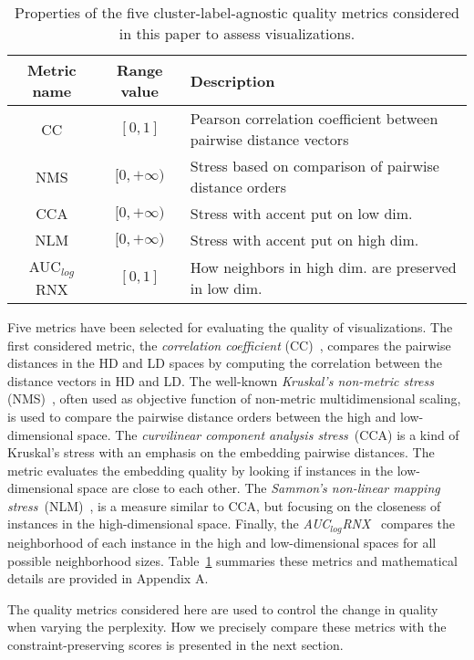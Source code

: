 \begin{table}
\renewcommand{\arraystretch}{1.08}
\caption{Properties of the five cluster-label-agnostic quality metrics considered in this paper to assess visualizations.}\label{tab:metrics}
\begin{tabular}{c c p{4.5cm}}
\hline
Metric name &  Range value & Description\\
\hline \hline
CC & $[0, 1]$ & Pearson correlation coefficient between pairwise distance vectors\\
NMS & $[0, +\infty)$ & Stress based on comparison of pairwise distance orders\\
CCA & $[0, +\infty)$ & Stress with accent put on low dim.\\
NLM & $[0, +\infty)$ & Stress with accent put on high dim.\\
AUC$_{log}$RNX & $[0, 1]$ & How neighbors in high dim. are preserved in low dim.\\
\hline
\end{tabular}
\end{table}

Five metrics have been selected for evaluating the quality of visualizations. 
The first considered metric, the \emph{correlation coefficient} (CC)~\cite{geng2005}, compares the pairwise distances in the HD and LD spaces by computing the correlation between the distance vectors in HD and LD. The well-known \emph{Kruskal's non-metric stress} (NMS)~\cite{kruskal1964}, often used as objective function of non-metric multidimensional scaling, is used to compare the pairwise distance orders between the high and low-dimensional space. The \emph{curvilinear component analysis stress}~(CCA) \cite{demartines1997} is a kind of Kruskal's stress with an emphasis on the embedding pairwise distances. The metric evaluates the embedding quality by looking if instances in the low-dimensional space are close to each other. The \emph{Sammon's non-linear mapping stress}~(NLM)~\cite{sammon1969}, is a measure similar to CCA, but focusing on the closeness of instances in the high-dimensional space. Finally, the \emph{AUC$_{log}$RNX}~\cite{lee2015} compares the neighborhood of each instance in the high and low-dimensional spaces for all possible neighborhood sizes. Table~\ref{tab:metrics} summaries these metrics and mathematical details are provided in Appendix A. %

The quality metrics considered here are used to control the change in quality when varying the perplexity. How we precisely compare these metrics with the constraint-preserving scores is presented in the next section.

